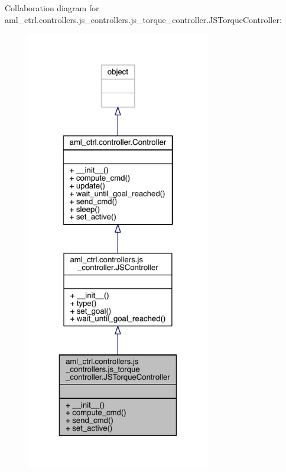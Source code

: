 Collaboration diagram for aml\+\_\+ctrl.\+controllers.\+js\+\_\+controllers.\+js\+\_\+torque\+\_\+controller.\+J\+S\+Torque\+Controller\+:\nopagebreak
\begin{figure}[H]
\begin{center}
\leavevmode
\includegraphics[height=550pt]{classaml__ctrl_1_1controllers_1_1js__controllers_1_1js__torque__controller_1_1_j_s_torque_controller__coll__graph}
\end{center}
\end{figure}
